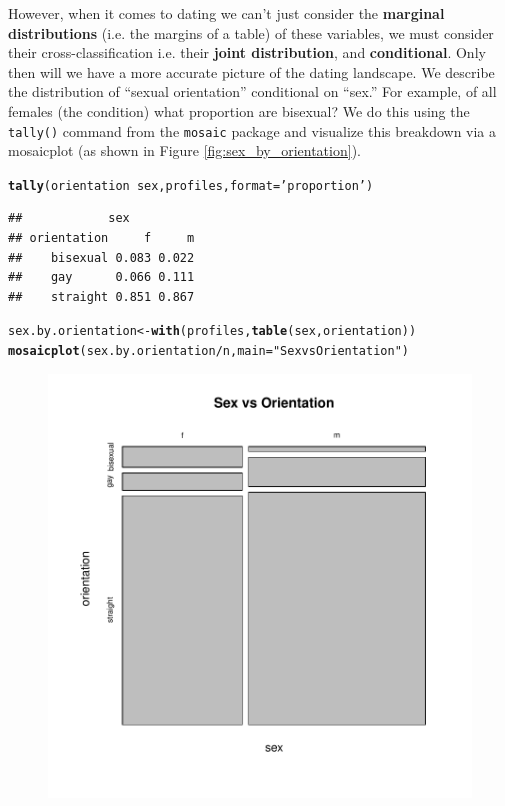 \documentclass{article}\usepackage[]{graphicx}\usepackage[]{color}
\makeatletter
\def\maxwidth{ %
  \ifdim\Gin@nat@width>\linewidth
    \linewidth
  \else
    \Gin@nat@width
  \fi
}
\newcommand{\hlstr}[1]{\textcolor[rgb]{0.192,0.494,0.8}{#1}}%
\newcommand{\hlopt}[1]{\textcolor[rgb]{0,0,0}{#1}}%
\newcommand{\hlstd}[1]{\textcolor[rgb]{0.345,0.345,0.345}{#1}}%
\newcommand{\hlkwb}[1]{\textcolor[rgb]{0.69,0.353,0.396}{#1}}%
\newcommand{\hlkwc}[1]{\textcolor[rgb]{0.333,0.667,0.333}{#1}}%
\newcommand{\hlkwd}[1]{\textcolor[rgb]{0.737,0.353,0.396}{\textbf{#1}}}%
\newenvironment{kframe}{%
 \def\at@end@of@kframe{}%
 \ifinner\ifhmode%
  \def\at@end@of@kframe{\end{minipage}}%
  \begin{minipage}{\columnwidth}%
 \fi\fi%
 \def\FrameCommand##1{\hskip\@totalleftmargin \hskip-\fboxsep
 \colorbox{shadecolor}{##1}\hskip-\fboxsep
     \hskip-\linewidth \hskip-\@totalleftmargin \hskip\columnwidth}%
 \MakeFramed {\advance\hsize-\width
   \@totalleftmargin\z@ \linewidth\hsize
   \@setminipage}}%
 {\par\unskip\endMakeFramed%
 \at@end@of@kframe}
\newenvironment{knitrout}{}{} %
\makeatother
\begin{document}
However, when it comes to dating we can't just consider the \textbf{marginal distributions} (i.e. the margins of a table) of these variables, we must consider their cross-classification i.e. their \textbf{joint distribution}, and \textbf{conditional}.  Only then will we have a more accurate picture of the dating landscape.  We describe the distribution of ``sexual orientation'' conditional on ``sex.''  For example, of all females (the condition) what proportion are bisexual?  We do this using the \verb#tally()# command from the \verb#mosaic# package and visualize this breakdown via a mosaicplot (as shown in Figure \ref{fig:sex_by_orientation}).

\begin{knitrout}
\color{fgcolor}\begin{kframe}
\begin{alltt}
\hlkwd{tally}\hlstd{(orientation} \hlopt{~} \hlstd{sex, profiles,} \hlkwc{format}\hlstd{=}\hlstr{'proportion'}\hlstd{)}
\end{alltt}
\begin{verbatim}
##            sex
## orientation     f     m
##    bisexual 0.083 0.022
##    gay      0.066 0.111
##    straight 0.851 0.867
\end{verbatim}
\begin{alltt}
\hlstd{sex.by.orientation} \hlkwb{<-} \hlkwd{with}\hlstd{(profiles,} \hlkwd{table}\hlstd{(sex, orientation))}
\hlkwd{mosaicplot}\hlstd{(sex.by.orientation}\hlopt{/}\hlstd{n,} \hlkwc{main}\hlstd{=}\hlstr{"Sex vs Orientation"}\hlstd{)}
\end{alltt}
\end{kframe}\begin{figure}

{\centering \includegraphics[width=\maxwidth]{figure/sex_by_orientation-1} 

}
\end{figure}
\end{knitrout}
\end{document}
